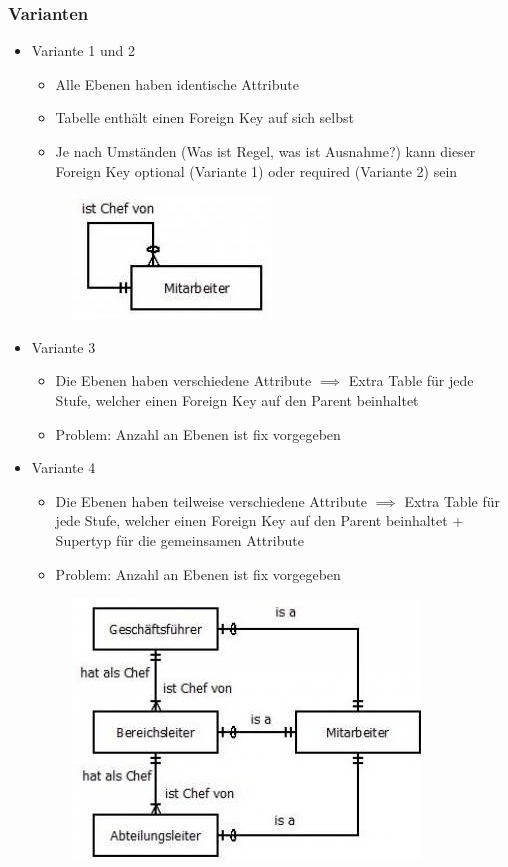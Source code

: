 \subsubsection{Varianten}
\begin{itemize}
    \item Variante 1 und 2
    \begin{itemize}
        \item Alle Ebenen haben identische Attribute
        \item Tabelle enthält einen Foreign Key auf sich selbst
        \item Je nach Umständen (Was ist Regel, was ist Ausnahme?) kann dieser Foreign Key optional (Variante 1) oder required (Variante 2) sein
    \end{itemize}
    \begin{figure}[H]
        \centering 
        \includegraphics{res/themenkorb_4/hierarchie_variante_2.jpg}
    \end{figure}
    \item Variante 3
    \begin{itemize}
        \item Die Ebenen haben verschiedene Attribute $\implies$ Extra Table für jede Stufe, welcher einen Foreign Key auf den Parent beinhaltet
        \item Problem: Anzahl an Ebenen ist fix vorgegeben
    \end{itemize}
    \item Variante 4
    \begin{itemize}
        \item Die Ebenen haben teilweise verschiedene Attribute $\implies$ Extra Table für jede Stufe, welcher einen Foreign Key auf den Parent beinhaltet + Supertyp für die gemeinsamen Attribute
        \item Problem: Anzahl an Ebenen ist fix vorgegeben
    \end{itemize}
    \begin{figure}[H]
        \centering 
        \includegraphics[scale=.8]{res/themenkorb_4/hierarchie_variante_4.jpg}
    \end{figure}
\end{itemize}
